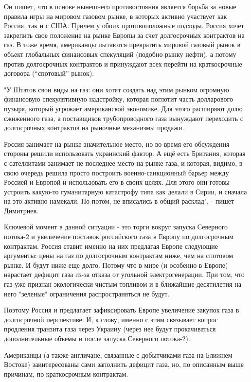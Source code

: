 Он пишет, что в основе нынешнего противостояния является борьба за новые
правила игры на мировом газовом рынке, в которых активно участвует как Россия,
так и с США. Причем у обоих противоположные подходы. Россия хочет закрепить
свое положение на рынке Европы за счет долгосрочных контрактов на газ. В тоже
время, американцы пытаются превратить мировой газовый рынок в объект глобальных
финансовых спекуляций (подобно рынку нефти), а потому против долгосрочных
контрактов и принуждают всех перейти на краткосрочные договора (\enquote{спотовый}
рынок).

"У Штатов свои виды на газ: они хотят создать над этим рынком огромную
финансовую спекулятивную надстройку, которая поглотит часть долларового пузыря,
который угрожает американской экономике. Для этого расширяют долю сжиженного
газа, а поставщиков трубопроводного газа вынуждают переходить с долгосрочных
контрактов на рыночные механизмы продажи.

Россия занимает на рынке значительное место, но во время его обсуждения стороны
решили использовать украинский фактор. А ещё есть Британия, которая с
сателлитами занимает не последнее место на рынке газа, и которая, видимо, в
свою очередь решила просто построить военно-санкционный барьер между Россией и
Европой и использовать его в своих целях. Для этого они готовы устроить
какую-то гуманитарную катастрофу типа как делали в Сирии, и сначала на это
активно намекали. Но потом, не вписались в общий расклад", - пишет Димитриев. 

Ключевой момент в данной ситуации - это торги вокруг запуска Северного потока-2
и увеличение поставок российского газа в Европу по долгосрочным контрактам.
Россия ставит именно на них предлагая Европе следующие аргументы: цены на газ
по долгосрочным контрактам ниже, чем на спотовом рынке. И будут ниже еще долго.
Потому что в мире (и особенно в Европе) нарастает дефицит газа из-за отказа от
угольной электрогенерации. При том, что газ уже признан экологически чистым
топливом и в ближайшие десятилетия на него "зеленые" ограничения
распространяться не будут.

Поэтому Россия и предлагает зафиксировать Европе увеличение закупок газа в
долгосрочной перспективе. И, к слову, именно с этим связывает вопрос продления
транзита газа через Украину (через нее будут прокачиваться дополнительные
объемы и после запуска Северного потока-2). 

Американцы (а также англичане, связанные с добытчиками газа на Ближнем Востоке)
заинтересованы сами заполнить дефицит газа, но, по описанным выше причинам, по
краткосрочным контрактам. 

